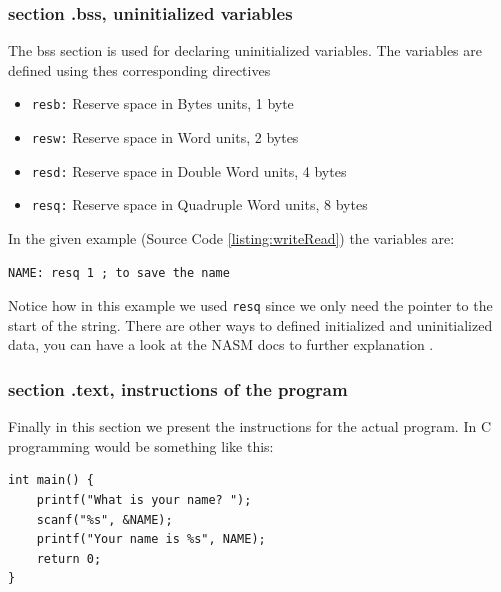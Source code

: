 \subsubsection{section .bss, uninitialized variables}
The bss section is used for declaring uninitialized variables. The variables  are defined using thes corresponding directives
\begin{itemize}
\item \texttt{resb:} Reserve space in Bytes units, 1 byte
\item \texttt{resw:} Reserve space in Word units, 2 bytes
\item \texttt{resd:} Reserve space in Double Word units, 4 bytes
\item \texttt{resq:} Reserve space in Quadruple Word units, 8 bytes
\end{itemize}
In the given example (Source Code \ref{listing:writeRead}) the variables are:
\begin{verbatim}
NAME: resq 1 ; to save the name
\end{verbatim}
Notice how in this example we used \texttt{resq} since we only need the pointer to the start of the string. There are other ways to defined initialized and uninitialized data, you can have a look at the NASM docs to further explanation \cite{website:NASM}.

\subsubsection{section .text, instructions of the program}
Finally in this section we present the instructions for the actual program. In C programming would be something like this:
\begin{verbatim}
int main() {
	printf("What is your name? ");
	scanf("%s", &NAME);
	printf("Your name is %s", NAME);
	return 0;
}
\end{verbatim}

